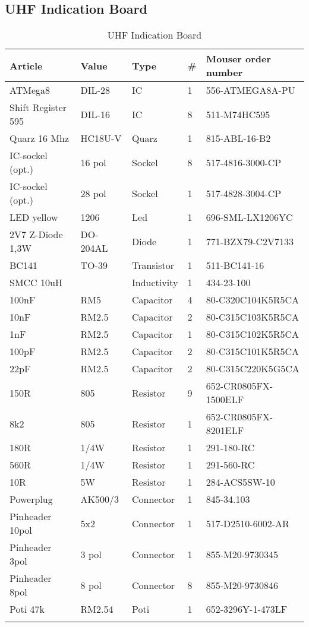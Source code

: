 \documentclass[12pt, a4paper]{report}
\begin{document}
\subsection{UHF Indication Board}
\begin{longtable}{ *{5}{| l } | }
\hline
\textbf{Article} & \textbf{Value} & \textbf{Type} & \textbf{\#} & \textbf{Mouser order number} \\
\hline
\endhead
ATMega8 & DIL-28 & IC & 1 & 556-ATMEGA8A-PU \\
Shift Register 595 & DIL-16 & IC & 8 & 511-M74HC595 \\
Quarz 16 Mhz & HC18U-V & Quarz & 1 & 815-ABL-16-B2 \\
IC-sockel (opt.) & 16 pol & Sockel & 8 & 517-4816-3000-CP \\
IC-sockel (opt.) & 28 pol & Sockel & 1 & 517-4828-3004-CP \\
LED yellow & 1206 & Led & 1 & 696-SML-LX1206YC \\
2V7 Z-Diode 1,3W & DO-204AL & Diode & 1 & 771-BZX79-C2V7133 \\
BC141 & TO-39 & Transistor & 1 & 511-BC141-16 \\
SMCC 10uH &  & Inductivity & 1 & 434-23-100 \\
100nF & RM5 & Capacitor & 4 & 80-C320C104K5R5CA \\
10nF & RM2.5 & Capacitor & 2 & 80-C315C103K5R5CA \\
1nF & RM2.5 & Capacitor & 1 & 80-C315C102K5R5CA \\
100pF & RM2.5 & Capacitor & 2 & 80-C315C101K5R5CA \\
22pF  & RM2.5 & Capacitor & 2 & 80-C315C220K5G5CA \\
150R & 805 & Resistor & 9 & 652-CR0805FX-1500ELF \\
8k2 & 805 & Resistor & 1 & 652-CR0805FX-8201ELF \\
180R & 1/4W & Resistor & 1 & 291-180-RC \\
560R & 1/4W & Resistor & 1 & 291-560-RC \\
10R & 5W & Resistor & 1 & 284-ACS5SW-10 \\
Powerplug & AK500/3 & Connector & 1 & 845-34.103 \\
Pinheader 10pol & 5x2 & Connector & 1 & 517-D2510-6002-AR \\
Pinheader 3pol & 3 pol & Connector & 1 & 855-M20-9730345 \\
Pinheader 8pol & 8 pol & Connector & 8 & 855-M20-9730846 \\
Poti 47k & RM2.54 & Poti & 1 & 652-3296Y-1-473LF \\
\hline
\caption {UHF Indication Board}
\end{longtable}
\end{document}

